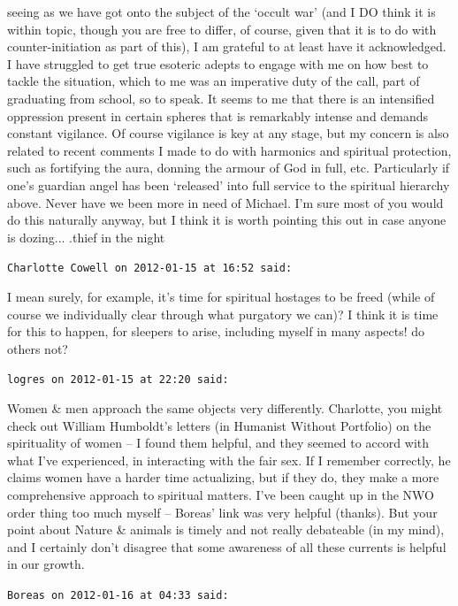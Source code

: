 \begin{footnotesize}
\begin{sffamily}
seeing as we have got onto the subject of the `occult war' (and I DO think it is within topic, though you are free to differ, of course, given that it is to do with counter-initiation as part of this), I am grateful to at least have it acknowledged. I have struggled to get true esoteric adepts to engage with me on how best to tackle the situation, which to me was an imperative duty of the call, part of graduating from school, so to speak. It seems to me that there is an intensified oppression present in certain spheres that is remarkably intense and demands constant vigilance. Of course vigilance is key at any stage, but my concern is also related to recent comments I made to do with harmonics and spiritual protection, such as fortifying the aura, donning the armour of God in full, etc. Particularly if one's guardian angel has been `released' into full service to the spiritual hierarchy above. Never have we been more in need of Michael. I'm sure most of you would do this naturally anyway, but I think it is worth pointing this out in case anyone is dozing... .thief in the night

\hfill

\texttt{Charlotte Cowell on 2012-01-15 at 16:52 said:}

I mean surely, for example, it's time for spiritual hostages to be freed (while of course we individually clear through what purgatory we can)? I think it is time for this to happen, for sleepers to arise, including myself in many aspects! do others not?

\hfill

\texttt{logres on 2012-01-15 at 22:20 said:}

Women \& men approach the same objects very differently. Charlotte, you might check out William Humboldt's letters (in Humanist Without Portfolio) on the spirituality of women -- I found them helpful, and they seemed to accord with what I've experienced, in interacting with the fair sex. If I remember correctly, he claims women have a harder time actualizing, but if they do, they make a more comprehensive approach to spiritual matters. I've been caught up in the NWO order thing too much myself -- Boreas' link was very helpful (thanks). But your point about Nature \& animals is timely and not really debateable (in my mind), and I certainly don't disagree that some awareness of all these currents is helpful in our growth.

\hfill

\texttt{Boreas on 2012-01-16 at 04:33 said:}


\end{sffamily}
\end{footnotesize}
